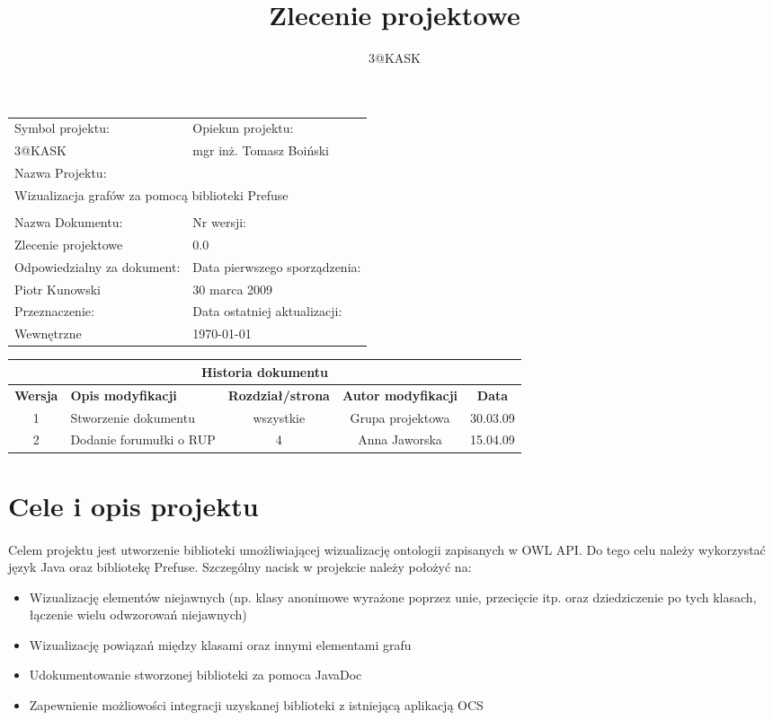 \documentclass[a4paper,10pt]{article}
\title{Zlecenie projektowe }
\author{3@KASK}
\begin{document}



\maketitle


\begin{center}
\begin{tabular}{|p{7cm}|p{7cm}|}
\hline
Symbol projektu: & Opiekun projektu:   \tabularnewline 
3@KASK & mgr inż. Tomasz Boiński    \tabularnewline \hline
\multicolumn{2}{|l|}{Nazwa Projektu: } \tabularnewline
\multicolumn{2}{|l|}{Wizualizacja grafów za pomocą biblioteki Prefuse} \tabularnewline 
\hline
\multicolumn{2}{l}{ } \tabularnewline %
\hline 
Nazwa Dokumentu: & Nr wersji:   \tabularnewline 
Zlecenie projektowe & 0.0 \tabularnewline \hline
Odpowiedzialny za dokument: & Data pierwszego sporządzenia:   \tabularnewline 
Piotr Kunowski & 30 marca 2009 \tabularnewline \hline
Przeznaczenie: & Data ostatniej aktualizacji:   \tabularnewline 
Wewnętrzne & \today \tabularnewline \hline
\end{tabular}
\end{center}

\begin{center}
\begin{tabular}{|c|p{4cm}|c|c|c|}
\multicolumn{5}{c}{\textbf{Historia dokumentu}} \tabularnewline \hline
\textbf{Wersja} & \textbf{Opis modyfikacji} & \textbf{Rozdział/strona} & \textbf{Autor modyfikacji} & \textbf{Data} \tabularnewline \hline 
1 & Stworzenie dokumentu & wszystkie & Grupa projektowa & 30.03.09 \tabularnewline \hline
2 & Dodanie forumułki o RUP   & 4   & Anna Jaworska & 15.04.09\tabularnewline \hline
\end{tabular}
 

\end{center}


\newpage
\tableofcontents
\newpage

\section{Cele i opis projektu}
\paragraph{} Celem projektu jest utworzenie biblioteki umożliwiającej wizualizację ontologii zapisanych w OWL API. Do tego celu należy wykorzystać język Java oraz bibliotekę Prefuse. Szczególny nacisk w projekcie należy położyć na:
\begin{itemize}
 \item Wizualizację elementów niejawnych (np. klasy anonimowe wyrażone
poprzez unie, przecięcie itp. oraz dziedziczenie po tych klasach,
łączenie wielu odwzorowań niejawnych) 
\item  Wizualizację powiązań między klasami oraz innymi elementami grafu 
\item  Udokumentowanie stworzonej biblioteki za pomoca JavaDoc
\item  Zapewnienie możliowości integracji uzyskanej biblioteki z istniejącą aplikacją OCS
\end{itemize}
	
\end{document}
